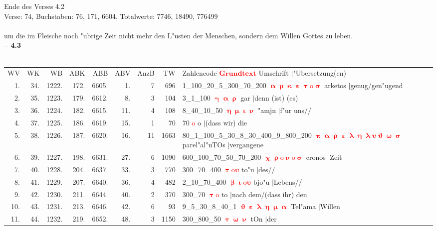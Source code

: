 \documentclass[a4paper,10pt,landscape]{article}
\begin{document}
Ende des Verses 4.2\\
Verse: 74, Buchstaben: 76, 171, 6604, Totalwerte: 7746, 18490, 776499\\
\\
um die im Fleische noch "ubrige Zeit nicht mehr den L"usten der Menschen, sondern dem Willen Gottes zu leben.\\
\newpage 
{\bf -- 4.3}\\
\medskip \\
\begin{tabular}{rrrrrrrrp{120mm}}
WV&WK&WB&ABK&ABB&ABV&AnzB&TW&Zahlencode \textcolor{red}{$\boldsymbol{Grundtext}$} Umschrift $|$"Ubersetzung(en)\\
1.&34.&1222.&172.&6605.&1.&7&696&1\_100\_20\_5\_300\_70\_200 \textcolor{red}{$\boldsymbol{\upalpha\uprho\upkappa\upepsilon\uptau\mathrm{o}\upsigma}$} arketos $|$genug/gen"ugend\\
2.&35.&1223.&179.&6612.&8.&3&104&3\_1\_100 \textcolor{red}{$\boldsymbol{\upgamma\upalpha\uprho}$} gar $|$denn (ist) (es)\\
3.&36.&1224.&182.&6615.&11.&4&108&8\_40\_10\_50 \textcolor{red}{$\boldsymbol{\upeta\upmu\upiota\upnu}$} "amjn $|$f"ur uns//\\
4.&37.&1225.&186.&6619.&15.&1&70&70 \textcolor{red}{$\boldsymbol{\mathrm{o}}$} o $|$(dass wir) die\\
5.&38.&1226.&187.&6620.&16.&11&1663&80\_1\_100\_5\_30\_8\_30\_400\_9\_800\_200 \textcolor{red}{$\boldsymbol{\uppi\upalpha\uprho\upepsilon\uplambda\upeta\uplambda\upsilon\upvartheta\upomega\upsigma}$} parel"al"uTOs $|$vergangene\\
6.&39.&1227.&198.&6631.&27.&6&1090&600\_100\_70\_50\_70\_200 \textcolor{red}{$\boldsymbol{\upchi\uprho\mathrm{o}\upnu\mathrm{o}\upsigma}$} cronos $|$Zeit\\
7.&40.&1228.&204.&6637.&33.&3&770&300\_70\_400 \textcolor{red}{$\boldsymbol{\uptau\mathrm{o}\upsilon}$} to"u $|$des//\\
8.&41.&1229.&207.&6640.&36.&4&482&2\_10\_70\_400 \textcolor{red}{$\boldsymbol{\upbeta\upiota\mathrm{o}\upsilon}$} bjo"u $|$Lebens//\\
9.&42.&1230.&211.&6644.&40.&2&370&300\_70 \textcolor{red}{$\boldsymbol{\uptau\mathrm{o}}$} to $|$nach dem/(dass ihr) den\\
10.&43.&1231.&213.&6646.&42.&6&93&9\_5\_30\_8\_40\_1 \textcolor{red}{$\boldsymbol{\upvartheta\upepsilon\uplambda\upeta\upmu\upalpha}$} Tel"ama $|$Willen\\
11.&44.&1232.&219.&6652.&48.&3&1150&300\_800\_50 \textcolor{red}{$\boldsymbol{\uptau\upomega\upnu}$} tOn $|$der\\

\end{tabular}
\end{document}
